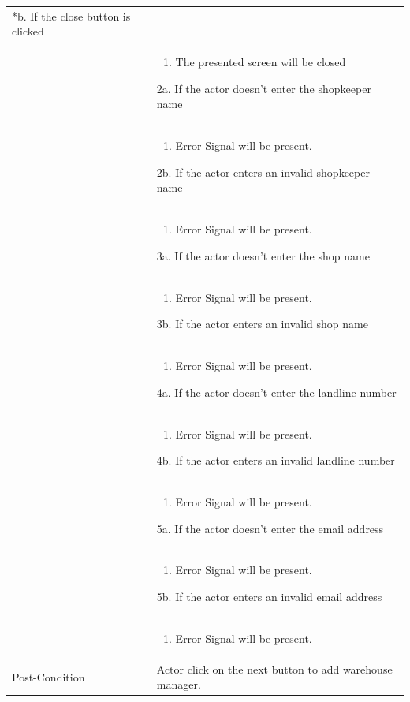 \documentclass[12pt,a4paper]{article}
\begin{document}
\begin{longtable}{| p{3cm}|p{12cm}|}
*b. If the close button is clicked\\
&	\begin{enumerate}
		\item The presented screen will be closed
	\end{enumerate}
2a. If the actor doesn't enter the shopkeeper name \\ 	
&	\begin{enumerate}
		\item Error Signal will be present.
	\end{enumerate}
2b. If the actor enters an invalid shopkeeper name \\ 	
&	\begin{enumerate}
		\item Error Signal will be present.
	\end{enumerate}
3a. If the actor doesn't enter the shop name \\ 	
&	\begin{enumerate}
		\item Error Signal will be present.
	\end{enumerate}
3b. If the actor enters an invalid shop name \\ 	
&	\begin{enumerate}
		\item Error Signal will be present.
	\end{enumerate}
4a. If the actor doesn't enter the landline number \\ 	
&	\begin{enumerate}
		\item Error Signal will be present.
	\end{enumerate}
4b. If the actor enters an invalid landline number\\ 	
&	\begin{enumerate}
		\item Error Signal will be present.
	\end{enumerate}
5a. If the actor doesn't enter the email address \\ 	
&	\begin{enumerate}
		\item Error Signal will be present.
	\end{enumerate}
5b. If the actor enters an invalid email address\\ 	
&	\begin{enumerate}
		\item Error Signal will be present.
	\end{enumerate}
\\ \hline
Post-Condition & Actor click on the next button to add warehouse manager.  \\\hline
\end{longtable}
\end{document}
